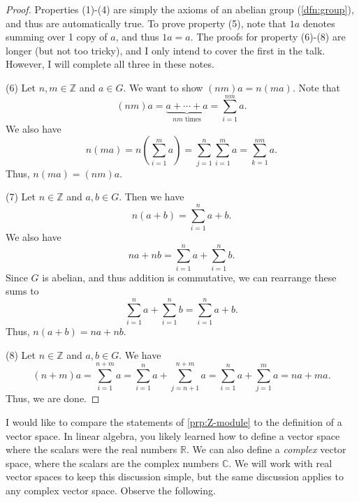 \begin{proof}
	Properties (1)-(4) are simply the axioms of an abelian group (\cref{dfn:group}), and thus are automatically true. To prove property (5), note that $1a$ denotes summing over 1 copy of $a$, and thus $1a=a$. The proofs for property (6)-(8) are longer (but not too tricky), and I only intend to cover the first in the talk. However, I will complete all three in these notes.

	(6) Let $n,m\in\mathbb{Z} $ and $a\in G$. We want to show $(nm)a=n(ma)$. Note that
	\[
		(nm)a = \underbrace{a+\cdots +a}_{nm\text{ times}} = \sum_{i=1}^{nm}a
	.\]
	We also have
	\[
		n(ma) = n\left( \sum_{i=1}^m a \right) =\sum_{j=1}^n\sum_{i=1}^m a = \sum_{k=1}^{nm} a
	.\]
	Thus, $n(ma)=(nm)a$.

	(7) Let $n\in\mathbb{Z} $ and $a,b\in G$. Then we have
	\[
		n(a+b) = \sum_{i=1}^n a+b
	.\]
	We also have
	\[
		na+nb = \sum_{i=1}^n a + \sum_{i=1}^n b
	.\]
	Since $G$ is abelian, and thus addition is commutative, we can rearrange these sums to
	\[
		\sum_{i=1}^n a + \sum_{i=1}^n b = \sum_{i=1}^n a+b
	.\]
	Thus, $n(a+b)=na+nb$.

	(8) Let $n\in\mathbb{Z} $ and $a,b\in G$. We have
	\[
		(n+m)a = \sum_{i=1}^{n+m} a =\sum_{i=1}^n a + \sum_{j=n+1}^{n+m} a = \sum_{i=1}^n a + \sum_{j=1}^m a = na + ma
	.\]
	Thus, we are done.
\end{proof}

I would like to compare the statements of \cref{prp:Z-module} to the definition of a vector space. In linear algebra, you likely learned how to define a vector space where the scalars were the real numbers $\mathbb{R} $. We can also define a \emph{complex} vector space, where the scalars are the complex numbers $\mathbb{C} $. We will work with real vector spaces to keep this discussion simple, but the same discussion applies to any complex vector space. Observe the following.

